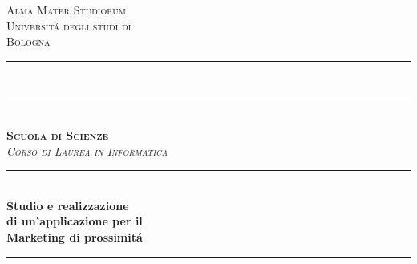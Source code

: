 \begin{titlepage}

\newcommand{\HRule}{\rule{\linewidth}{0.5mm}} %

\newcommand{\HRulea}{\rule{\linewidth}{0.5mm}} %

\newcommand{\HRuleb}{\rule{\linewidth}{0.7mm}} %

\newcommand{\newlecture}{%
  \clearpage
  \refstepcounter{lecture}%
  \noindent{\large\bfseries \lecturename{} \thelecture}%
  \par\bigskip\noindent\ignorespaces%
}

\renewcommand{\sectionmark}[1]{\markright{#1}}

\renewcommand{\familydefault}{\rmdefault}

\center %
 

\textsc{\LARGE Alma Mater Studiorum}\\[0.2cm] %
\textsc{\LARGE Universit\'a degli studi di}\\[0.2cm] %
\textsc{\LARGE Bologna}\\[0.1cm]
\HRulea \\[0.0cm]
\HRuleb \\[0.5cm]
\textsc {\textbf{\LARGE Scuola di Scienze}}\\[0.5cm] %
\textsc{\textit{\Large Corso di Laurea in Informatica}}\\[0.5cm] %


\HRule \\[0.4cm]
{ \huge \bfseries Studio e realizzazione}\\[0.4cm] %
{ \huge \bfseries di un'applicazione per il}\\[0.4cm] %
{ \huge \bfseries Marketing di prossimit\'a}\\[0.4cm] %
\HRule \\[1cm]
 

\end{titlepage}
